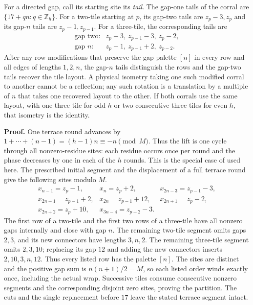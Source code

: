 \documentclass[11pt,a4paper]{article}
\newcommand{\labelledparagraphstart}{\par\addvspace{3pt plus 1pt minus 1pt}\noindent}
\begin{document}
For a directed gap, call its starting site its \emph{tail}. The gap-one tails of the corral are \(\{17+qn:q\in\mathbb Z_h\}\). For a two-tile starting at \(p\), its gap-two tails are \(z_p-3,z_p\) and its gap-\(n\) tails are \(z_p-1,z_{p-1}\). For a three-tile, the corresponding tails are \[
 \begin{array}{ll}
 \text{gap two:}&z_p-3,\ z_{p-1}-3,\ z_p-2,\\
 \text{gap }n:&z_p-1,\ z_{p-1}+2,\ z_{p-2}.
 \end{array}
\] After any row modifications that preserve the gap palette \([n]\) in every row and all edges of lengths \(1,2,n\), the gap-\(n\) tails distinguish the rows and the gap-two tails recover the tile layout. A physical isometry taking one such modified corral to another cannot be a reflection; any such rotation is a translation by a multiple of \(n\) that takes one recovered layout to the other. If both corrals use the same layout, with one three-tile for odd \(h\) or two consecutive three-tiles for even \(h\), that isometry is the identity.

\labelledparagraphstart\textbf{Proof.} One terrace round advances by \(1+\cdots+(n-1)=(h-1)n\equiv-n\pmod M\). Thus the lift is one cycle through all nonzero-residue sites: each residue occurs once per round and the phase decreases by one in each of the \(h\) rounds. This is the special case of \cite[Proposition 6.2]{JY26} used here. The prescribed initial segment and the displacement of a full terrace round give the following sites modulo \(M\). \begin{equation}
\begin{array}{lll}
 x_{n-1}=z_p-1,&x_n=z_p+2,&x_{2n-3}=z_{p-1}-3,\\
 x_{2n-1}=z_{p-1}+2,&x_{2n}=z_{p-1}+12,&x_{2n+1}=z_p-2,\\
 x_{2n+2}=z_p+10,&x_{3n-4}=z_{p-2}-3.
\end{array}
\tag{H3}\label{eq:H3}
\end{equation} The first row of a two-tile and the first two rows of a three-tile have all nonzero gaps internally and close with gap \(n\). The remaining two-tile segment omits gaps \(2,3\), and its new connectors have lengths \(3,n,2\). The remaining three-tile segment omits \(2,3,10\); replacing its gap \(12\) and adding the new connectors inserts \(2,10,3,n,12\). Thus every listed row has the palette \([n]\). The sites are distinct and the positive gap sum is \(n(n+1)/2=M\), so each listed order winds exactly once, including the actual wrap. Successive tiles consume consecutive nonzero segments and the corresponding disjoint zero sites, proving the partition. The cuts and the single replacement before \(17\) leave the stated terrace segment intact.
\end{document}
